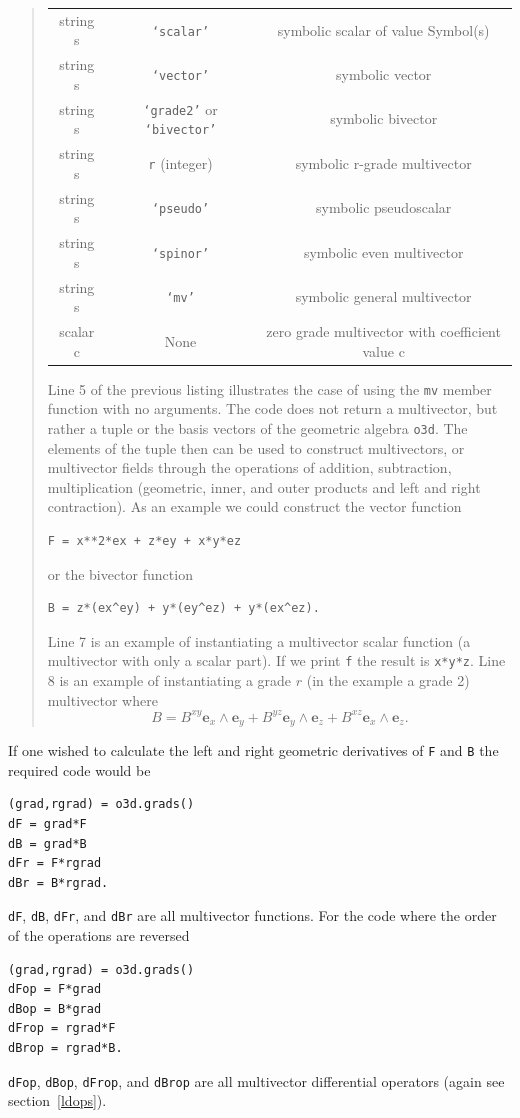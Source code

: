 \documentclass[12pt]{report}
\newcommand{\bm}[1]{\boldsymbol{#1}}
\newcommand{\W}{\wedge}
\newcommand{\T}[1]{\texttt{#1}}
\begin{document}
\begin{quote}
\begin{center}
\begin{tabular}{ccc}
         string s &  \T{`scalar'} & symbolic scalar of value Symbol(s) \\
         string s  &\T{`vector'} &  symbolic vector \\
         string s & \T{`grade2'} or \T{`bivector'} & symbolic bivector \\
         string s &  \T{r} (integer) & symbolic r-grade multivector \\
         string s &  \T{`pseudo'} & symbolic pseudoscalar \\
         string s &  \T{`spinor'} & symbolic even multivector \\
         string s &  \T{`mv'} & symbolic general multivector \\
         scalar c & None  &  zero grade multivector with coefficient value c
    \end{tabular}
\end{center}
Line 5 of the previous listing illustrates the case of using the \T{mv} member function with
no arguments. The code does not return a multivector, but rather a tuple or the basis vectors of the geometric algebra \T{o3d}.
The elements of the tuple then can
be used to construct multivectors, or multivector fields through the operations
of addition, subtraction, multiplication (geometric, inner, and outer products and left and right contraction).
As an example we could construct the vector function
\begin{lstlisting}[numbers=none]
F = x**2*ex + z*ey + x*y*ez
\end{lstlisting}
\vspace{-12pt}or the bivector function
\begin{lstlisting}[numbers=none]
B = z*(ex^ey) + y*(ey^ez) + y*(ex^ez).
\end{lstlisting}
\vspace{-7pt}Line 7 is an example of instantiating a multivector scalar function (a multivector with only a scalar part). If
we print \T{f} the result is \T{x*y*z}.  Line 8 is an example of instantiating a grade $r$ (in the example a grade 2) multivector
where
\begin{equation}
    B = B^{xy}\bm{e}_{x}\W\bm{e}_{y}+B^{yz}\bm{e}_{y}\W\bm{e}_{z}+B^{xz}\bm{e}_{x}\W\bm{e}_{z}.
\end{equation}
\end{quote}
If one wished to calculate the left and right geometric derivatives of \T{F} and \T{B} the required code would be
\begin{lstlisting}
(grad,rgrad) = o3d.grads()
dF = grad*F
dB = grad*B
dFr = F*rgrad
dBr = B*rgrad.
\end{lstlisting}
\T{dF}, \T{dB}, \T{dFr}, and \T{dBr} are all multivector functions. For the code where the order of the operations are
reversed
\begin{lstlisting}
(grad,rgrad) = o3d.grads()
dFop = F*grad
dBop = B*grad
dFrop = rgrad*F
dBrop = rgrad*B.
\end{lstlisting}
\T{dFop}, \T{dBop}, \T{dFrop}, and \T{dBrop} are all multivector differential operators (again see section~\ref{ldops}).
\end{document}
